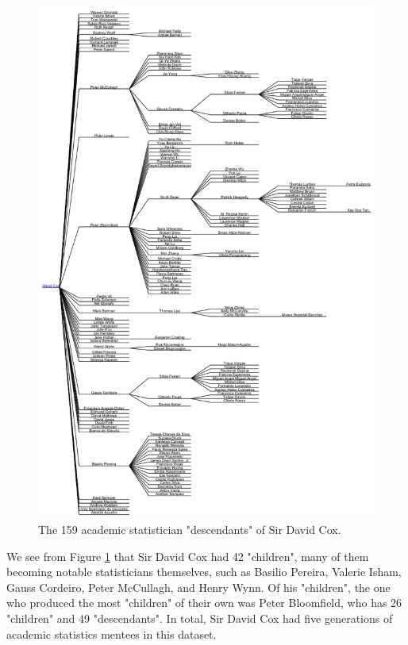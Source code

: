 \documentclass[11pt,a4paper,oldfontcommands,openany]{memoir}
\numberwithin{equation}{section} %
\begin{document}
\begin{figure}%
    \begin{framed}
    \centering
    \includegraphics[width=\textwidth]{dCox.png}
    \end{framed}
    \caption{The 159 academic statistician "descendants" of Sir David Cox.}
    \label{fig:dCox}
\end{figure}

We see from Figure \ref{fig:dCox} that Sir David Cox had 42 "children", many of them becoming notable statisticians themselves, such as Basilio Pereira, Valerie Isham, Gauss Cordeiro, Peter McCullagh, and Henry Wynn. Of his "children", the one who produced the most "children" of their own was Peter Bloomfield, who has 26 "children" and 49 "descendants". In total, Sir David Cox had five generations of academic statistics mentees in this dataset.
\end{document}
